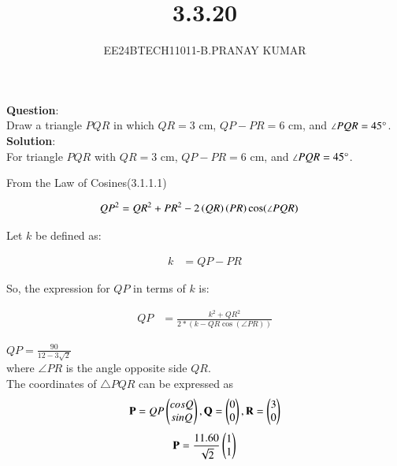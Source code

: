 \documentclass[journal]{IEEEtran}
\begin{document}

\vspace{3cm}

\title{3.3.20}
\author{EE24BTECH11011-B.PRANAY KUMAR
}
 \maketitle
{\let\newpage\relax\maketitle}

\renewcommand{\thefigure}{\theenumi}
\renewcommand{\thetable}{\theenumi}
\setlength{\intextsep}{10pt} %


\renewcommand{\thetable}{\theenumi}



\textbf{Question}:\\
Draw a triangle $PQR$ in which $QR = 3$ cm, $QP - PR = 6$ cm, and $\angle PQR = 45\degree$.\\

\textbf{Solution}:\\
For triangle $PQR$ with $QR = 3$ cm, $QP - PR = 6$ cm, and $\angle PQR = 45\degree$.

From the Law of Cosines(3.1.1.1)

\begin{align}
    QP^2 &= QR^2 + PR^2 - 2  \left(QR\right)  \left(PR\right)\cos(\angle PQR) 
\end{align}

Let $k$ be defined as:

\begin{align}
    k &= QP - PR
\end{align}

So, the expression for $QP$ in terms of $k$ is:

\begin{align}
    QP &= \frac{k^2 + QR^2}{2 * \left(k - QR \cos(\angle PR)\right)}
    \end{align}

   $QP = \frac{90}{12 - 3\sqrt{2}} $\\

 
where $\angle PR$ is the angle opposite side $QR$.\\

The coordinates of $\triangle{PQR}$ can be expressed as
\begin{align}
    \mathbf {P }=  QP\begin{pmatrix}cos Q \\ sin Q\end{pmatrix} ,\mathbf {Q} = \begin{pmatrix}0 \\ 0\end{pmatrix},\mathbf{R}=\begin{pmatrix}3\\0\end{pmatrix}
\end{align}
\begin{align}
    \mathbf{P}=\frac{11.60}{\sqrt{2}}\begin{pmatrix}1\\1\end{pmatrix}
\end{align}
\end{document}
